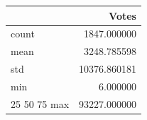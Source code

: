 \begin{tabular}{lr}
\toprule
 & Votes \\
\midrule
count & 1847.000000 \\
mean & 3248.785598 \\
std & 10376.860181 \\
min & 6.000000 \\
25%
50%
75%
max & 93227.000000 \\
\bottomrule
\end{tabular}
